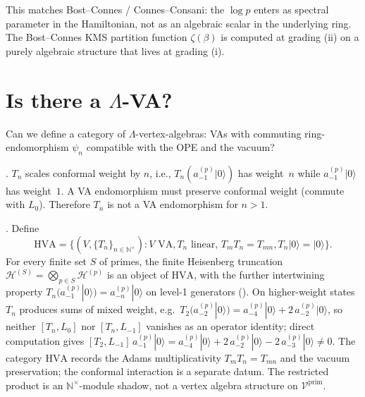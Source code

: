 \begin{remark}
This matches Bost--Connes / Connes--Consani: the \(\log p\) enters
as spectral parameter in the Hamiltonian, not as an algebraic
scalar in the underlying ring. The Bost--Connes KMS partition
function \(\zeta(\beta)\) is computed at grading (ii) on a purely
algebraic structure that lives at grading (i).
\end{remark}

\section{Is there a \(\Lambda\)-VA?}
\label{v4-arith:gb:is-there-lambda-VA}

\begin{question}
Can we define a category of \(\Lambda\)-vertex-algebras: VAs with
commuting ring-endomorphism \(\psi_{n}\) compatible with the OPE
and the vacuum?
\end{question}

\begin{proposition}
\label{v4-arith:prop:T-n-not-VA-endo}
\ClaimStatusProvedHere. \(T_{n}\) scales conformal weight by \(n\),
i.e., \(T_{n}(a^{(p)}_{-1}|0\rangle)\) has weight~\(n\) while
\(a^{(p)}_{-1}|0\rangle\) has weight~\(1\). A VA endomorphism must
preserve conformal weight (commute with \(L_{0}\)). Therefore
\(T_{n}\) is not a VA endomorphism for \(n>1\).
\end{proposition}

\begin{theorem}
\label{v4-arith:thm:HVA-category}
\ClaimStatusProvedHere. Define
\begin{equation*}
\mathrm{HVA}=\{(V,\{T_{n}\}_{n\in\mathbb{N}^{\times}})\colon
V\text{ VA}, T_{n}\text{ linear, }T_{m}T_{n}=T_{mn},
T_{n}|0\rangle=|0\rangle\}.
\end{equation*}
For every finite set \(S\) of primes, the finite Heisenberg truncation
\(\mathcal{H}^{(S)}=\bigotimes_{p\in S}\mathcal{H}^{(p)}\) is an object
of \(\mathrm{HVA}\), with the further intertwining property
\(T_n(a^{(p)}_{-1}|0\rangle)=a^{(p)}_{-n}|0\rangle\) on level-1
generators (). On higher-weight
states \(T_n\) produces sums of mixed weight, e.g.\
\(T_2(a^{(p)}_{-2}|0\rangle)=a^{(p)}_{-4}|0\rangle+2\,a^{(p)}_{-2}|0\rangle\),
so neither \([T_n,L_{0}]\) nor \([T_n,L_{-1}]\) vanishes as an operator
identity; direct computation gives
\([T_2,L_{-1}]\,a^{(p)}_{-1}|0\rangle=a^{(p)}_{-4}|0\rangle+2\,a^{(p)}_{-2}|0\rangle-2\,a^{(p)}_{-3}|0\rangle\neq 0\).
The category \(\mathrm{HVA}\) records the Adams multiplicativity
\(T_mT_n=T_{mn}\) and the vacuum preservation; the conformal
interaction is a separate datum. The restricted product is an
\(\mathbb{N}^{\times}\)-module shadow, not a vertex algebra structure on
\(\mathcal{V}^{\mathrm{prim}}\).
\end{theorem}

